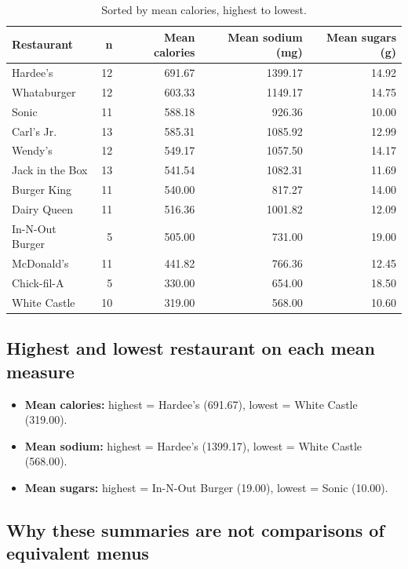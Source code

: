 \documentclass[11pt]{article}
\begin{document}
\begin{table}[H]\centering\small
\begin{tabular}{lrrrr}
\toprule
Restaurant & n & Mean calories & Mean sodium (mg) & Mean sugars (g) \\
\midrule
Hardee's        & 12 & 691.67 & 1399.17 & 14.92 \\
Whataburger     & 12 & 603.33 & 1149.17 & 14.75 \\
Sonic           & 11 & 588.18 & 926.36  & 10.00 \\
Carl's Jr.      & 13 & 585.31 & 1085.92 & 12.99 \\
Wendy's         & 12 & 549.17 & 1057.50 & 14.17 \\
Jack in the Box & 13 & 541.54 & 1082.31 & 11.69 \\
Burger King     & 11 & 540.00 & 817.27  & 14.00 \\
Dairy Queen     & 11 & 516.36 & 1001.82 & 12.09 \\
In-N-Out Burger & 5  & 505.00 & 731.00  & 19.00 \\
McDonald's      & 11 & 441.82 & 766.36  & 12.45 \\
Chick-fil-A     & 5  & 330.00 & 654.00  & 18.50 \\
White Castle    & 10 & 319.00 & 568.00  & 10.60 \\
\bottomrule
\end{tabular}
\caption{Sorted by mean calories, highest to lowest.}
\end{table}

\subsection*{Highest and lowest restaurant on each mean measure}

\begin{itemize}\itemsep2pt
  \item \textbf{Mean calories:} highest = Hardee's (691.67), lowest = White Castle (319.00).
  \item \textbf{Mean sodium:} highest = Hardee's (1399.17), lowest = White Castle (568.00).
  \item \textbf{Mean sugars:} highest = In-N-Out Burger (19.00), lowest = Sonic (10.00).
\end{itemize}

\subsection*{Why these summaries are not comparisons of equivalent menus}
\end{document}
